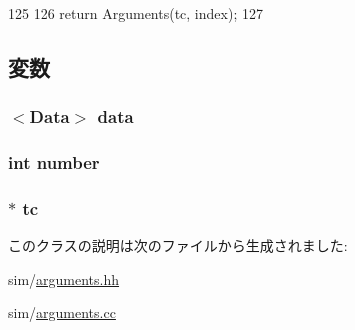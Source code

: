 \begin{DoxyCode}
125                                     {
126         return Arguments(tc, index);
127     }
\end{DoxyCode}


\subsection{変数}
\hypertarget{classArguments_a8621be0cca1e69cde818d4136fd6d104}{
\subsubsection[{data}]{$<${\bf Data}$>$ {\bf data}}}
\label{classArguments_a8621be0cca1e69cde818d4136fd6d104}
\hypertarget{classArguments_a7106e2abc437ad981830d14176d15f09}{
\subsubsection[{number}]{\setlength{\rightskip}{0pt plus 5cm}int {\bf number}}}
\label{classArguments_a7106e2abc437ad981830d14176d15f09}
\hypertarget{classArguments_a4455a4759e69e5ebe68ae7298cbcc37d}{
\subsubsection[{tc}]{$\ast$ {\bf tc}}}
\label{classArguments_a4455a4759e69e5ebe68ae7298cbcc37d}


このクラスの説明は次のファイルから生成されました:\begin{DoxyCompactItemize}
\item 
sim/\hyperlink{arguments_8hh}{arguments.hh}\item 
sim/\hyperlink{arguments_8cc}{arguments.cc}\end{DoxyCompactItemize}
